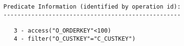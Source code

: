 \documentclass[11pt,a4paper,parskip=half]{scrartcl}
\begin{document}
\begin{lstlisting}
Predicate Information (identified by operation id):                                                                                                                                                                                                                                                          
---------------------------------------------------                                                                                                                                                                                                                                                          
                                                                                                                                                                                                                                                                                                             
   3 - access("O_ORDERKEY"<100)                                                                                                                                                                                                                                                                              
   4 - filter("O_CUSTKEY"="C_CUSTKEY")                                                                                                                                                                                                                                                                       
\end{lstlisting}
\end{document}
